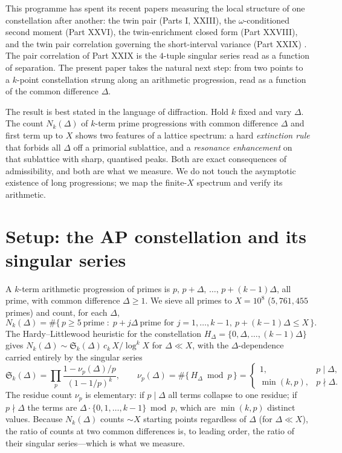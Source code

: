 \documentclass[11pt]{article}
\theoremstyle{definition}
\newcommand{\Sing}{\mathfrak{S}}
\begin{document}
This programme has spent its recent papers measuring the local structure of one constellation after
another: the twin pair (Parts I, XXIII), the $\omega$-conditioned second moment (Part XXVI), the
twin-enrichment closed form (Part XXVIII), and the twin pair correlation governing the short-interval
variance (Part XXIX) \cite{PXXIX}. The pair correlation of Part XXIX is the $4$-tuple singular series
read as a function of separation. The present paper takes the natural next step: from two points to a
$k$-point constellation strung along an arithmetic progression, read as a function of the common
difference $\Delta$.

The result is best stated in the language of diffraction. Hold $k$ fixed and vary $\Delta$. The count
$N_k(\Delta)$ of $k$-term prime progressions with common difference $\Delta$ and first term up to $X$
shows two features of a lattice spectrum: a hard \emph{extinction rule} that forbids all $\Delta$ off
a primorial sublattice, and a \emph{resonance enhancement} on that sublattice with sharp, quantised
peaks. Both are exact consequences of admissibility, and both are what we measure. We do not touch the
asymptotic existence of long progressions; we map the finite-$X$ spectrum and verify its arithmetic.

\section{Setup: the AP constellation and its singular series}
A $k$-term arithmetic progression of primes is $p,\,p+\Delta,\,\dots,\,p+(k-1)\Delta$, all prime,
with common difference $\Delta\ge1$. We sieve all primes to $X=10^{8}$ ($5{,}761{,}455$ primes) and
count, for each $\Delta$,
\[
N_k(\Delta)=\#\bigl\{\,p\ge5\ \text{prime}\;:\;p+j\Delta\ \text{prime for }j=1,\dots,k-1,\ p+(k-1)\Delta\le X\,\bigr\}.
\]
The Hardy--Littlewood heuristic for the constellation $H_\Delta=\{0,\Delta,\dots,(k-1)\Delta\}$ gives
$N_k(\Delta)\sim \Sing_k(\Delta)\,c_k\,X/\log^k X$ for $\Delta\ll X$, with the $\Delta$-dependence
carried entirely by the singular series
\begin{equation}
\Sing_k(\Delta)=\prod_p \frac{1-\nu_p(\Delta)/p}{(1-1/p)^{k}},\qquad
\nu_p(\Delta)=\#\{\,H_\Delta \bmod p\,\}=
\begin{cases}1,& p\mid\Delta,\\[2pt]\min(k,p),& p\nmid\Delta.\end{cases}
\label{eq:Sk}
\end{equation}
The residue count $\nu_p$ is elementary: if $p\mid\Delta$ all terms collapse to one residue; if
$p\nmid\Delta$ the terms are $\Delta\cdot\{0,1,\dots,k-1\}\bmod p$, which are $\min(k,p)$ distinct
values. Because $N_k(\Delta)$ counts $\sim\!X$ starting points regardless of $\Delta$ (for
$\Delta\ll X$), the ratio of counts at two common differences is, to leading order, the ratio of their
singular series---which is what we measure.
\end{document}
